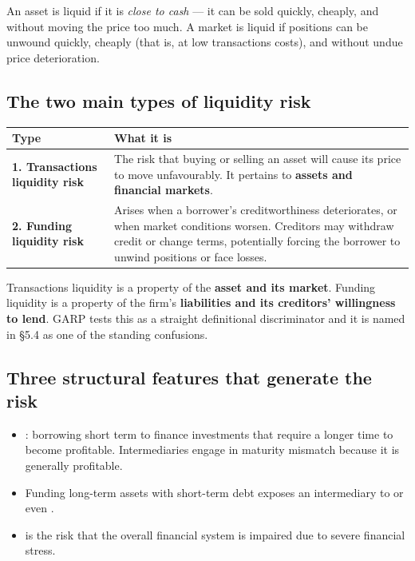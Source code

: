 \begin{lrdefbox}
An asset is liquid if it is \emph{close to cash} — it can be sold quickly, cheaply, and without moving the price too much. A market is liquid if positions can be unwound quickly, cheaply (that is, at low transactions costs), and without undue price deterioration.
\end{lrdefbox}

\subsection{The two main types of liquidity risk}

\begin{center}
\small
\begin{tabularx}{\textwidth}{@{}p{3.8cm} X@{}}
\toprule
\rowcolor{FRMSoft}\textbf{Type} & \textbf{What it is} \\
\midrule
\textbf{1. Transactions liquidity risk} & The risk that buying or selling an asset will cause its price to move unfavourably. It pertains to \textbf{assets and financial markets}. \\
\addlinespace
\textbf{2. Funding liquidity risk} & Arises when a borrower's creditworthiness deteriorates, or when market conditions worsen. Creditors may withdraw credit or change terms, potentially forcing the borrower to unwind positions or face losses. \\
\bottomrule
\end{tabularx}
\end{center}

\begin{lrtrapbox}
Transactions liquidity is a property of the \textbf{asset and its market}. Funding liquidity is a property of the firm's \textbf{liabilities and its creditors' willingness to lend}. GARP tests this as a straight definitional discriminator and it is named in \S5.4 as one of the standing confusions.
\end{lrtrapbox}

\subsection{Three structural features that generate the risk}

\begin{itemize}
\item {}: borrowing short term to finance investments that require a longer time to become profitable. Intermediaries engage in maturity mismatch because it is generally profitable.
\item Funding long-term assets with short-term debt exposes an intermediary to  or even .
\item {} is the risk that the overall financial system is impaired due to severe financial stress.
\end{itemize}

